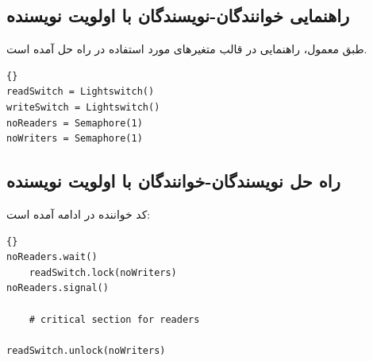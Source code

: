 \documentclass{book}
\newcommand{\clearemptydoublepage}{\newpage\cleardoublepage}
\begin{document}
\clearemptydoublepage
\subsection{راهنمایی خوانندگان-نویسندگان با اولویت نویسنده}

    طبق معمول،‌ راهنمایی در قالب متغیرهای مورد استفاده در راه حل آمده است. 

\begin{latin}
\begin{latin}
\begin{lstlisting}[title=\rl{مقداردهی اولیه خوانندگان-نویسندگان با اولویت نویسنده}]{}
readSwitch = Lightswitch()
writeSwitch = Lightswitch()
noReaders = Semaphore(1)
noWriters = Semaphore(1)
\end{lstlisting}
\end{latin}
\end{latin}



\clearemptydoublepage
\subsection{راه حل نویسندگان-خوانندگان با اولویت نویسنده}


    کد خواننده در ادامه آمده است:

\begin{latin}
\begin{latin}
\begin{lstlisting}[title=\rl{راه حل خواننده با اولویت نویسنده}]{}
noReaders.wait()
    readSwitch.lock(noWriters)
noReaders.signal()

    # critical section for readers

readSwitch.unlock(noWriters)
\end{lstlisting}
\end{latin}
\end{latin}
\end{document}
